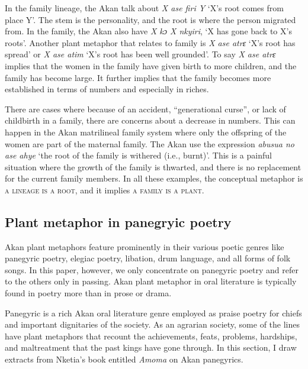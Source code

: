 \documentclass[output=paper,colorlinks,citecolor=brown]{langscibook}
\begin{document}
In the family lineage, the Akan talk about \textit{X ase firi Y} `X’s root comes from place Y'. The stem is the personality, and the root is where the person migrated from. In the family, the Akan also have \textit{X kɔ X nkyiri}, `X has gone back to X’s roots'. Another plant metaphor that relates to family is \textit{X ase atrɛ} `X’s root has spread’ or \textit{X ase atim} `X’s root has been well grounded'. To say \textit{X ase atrɛ} implies that the women in the family have given birth to more children, and the family has become large. It further implies that the family becomes more established in terms of numbers and especially in riches.
 
There are cases where because of an accident, ``generational curse'', or lack of childbirth in a family, there are concerns about a decrease in numbers. This can happen in the Akan matrilineal family system where only the offspring of the women are part of the maternal family. The Akan use the expression \textit{abusua no ase ahye} `the root of the family is withered (i.e., burnt)'. This is a painful situation where the growth of the family is thwarted, and there is no replacement for the current family members. In all these examples, the conceptual metaphor is \textsc{a lineage is a root}, and it implies \textsc{a family is a plant}.

\subsection{Plant metaphor in panegryic poetry}

Akan plant metaphors feature prominently in their various poetic genres like panegyric poetry, elegiac poetry, libation, drum language, and all forms of folk songs. In this paper, however, we only concentrate on panegyric poetry and refer to the others only in passing. Akan plant metaphor in oral literature is typically found in poetry more than in prose or drama.

Panegyric is a rich Akan oral literature genre employed as praise poetry for chiefs and important dignitaries of the society. As an agrarian society, some of the lines have plant metaphors that recount the achievements, feats, problems, hardships, and maltreatment that the past kings have gone through. In this section, I draw extracts from Nketia’s \citeyearpar{Nketia1978} book entitled \textit{Amoma} on Akan panegyrics. 
\end{document}
